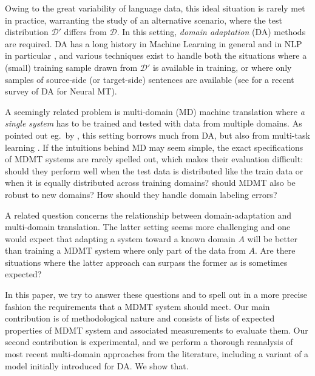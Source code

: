 \documentclass[11pt]{article}
\newcommand{\fyTodo}[1]{\Todo[FY:]{\textcolor{orange}{#1}}}
\begin{document}
Owing to the great variability of language data, this ideal situation is rarely met in practice, warranting the study of an alternative scenario, where the test distribution $\mathcal{D'}$ differs from $\mathcal{D}$. In this setting, \emph{domain adaptation} (DA) methods are required. DA has a long history in Machine Learning in general \cite{Shimodaira00improving,Ben-David09atheory} and in NLP in particular \cite{Daume06domain,Blitzer07domain}, and various techniques exist to handle both the situations where a (small) training sample drawn from $\mathcal{D'}$ is available in training, or where only samples of source-side (or target-side) sentences are available (see \cite{Chu18asurvey} for a recent survey of DA for Neural MT).

A seemingly related problem is multi-domain (MD) machine translation \cite{Hassan17neural,Farajian17multidomain,Kobus17domaincontrol,Zeng18multidomain,Pham19generic} where \emph{a single system} has to be trained  and tested with data from multiple domains. As pointed out eg.\ by , this setting borrows much from DA, but also from multi-task learning \cite{Caruana97multitask}. If the intuitions behind MD may seem simple, the exact specifications of MDMT systems are rarely spelled out, which makes their evaluation difficult: should they perform well when the test data is distributed like the train data or when it is equally distributed across training domains? should MDMT also be robust to new domains? How should they handle domain labeling errors? 

A related question concerns the relationship between domain-adaptation and multi-domain translation. The latter setting seems more challenging and one would expect that adapting a system toward a known domain $A$ will be better than training a MDMT system where only part of the data from $A$. Are there situations where the latter approach can surpass the former as is sometimes expected?
 
In this paper, we try to answer these questions and to spell out in a more precise fashion the requirements that a MDMT system should meet. Our main contribution is of methodological nature and consists of lists of expected properties of MDMT system and associated measurements to evaluate them. \fyTodo{New problems - continuous learning, automatic domains}Our second contribution is experimental, and we perform a thorough reanalysis of most recent multi-domain approaches from the literature, including a variant of a model initially introduced for DA. We show that\fyTodo{Spell out conclusions}.
 
\end{document}
